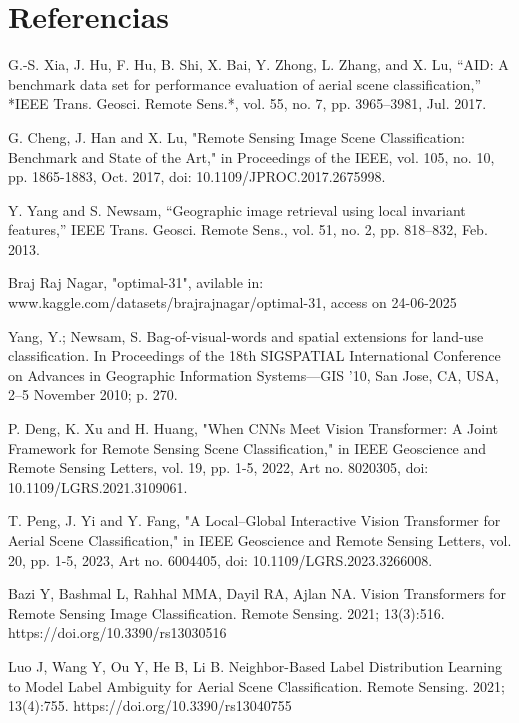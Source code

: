 \documentclass[conference]{IEEEtran}
\begin{document}
\section{Referencias}
\begin{thebibliography}{00}

     G.-S. Xia, J. Hu, F. Hu, B. Shi, X. Bai, Y. Zhong, L. Zhang, and X. Lu, ``AID: A benchmark data set for performance evaluation of aerial scene classification,'' *IEEE Trans. Geosci. Remote Sens.*, vol. 55, no. 7, pp. 3965--3981, Jul. 2017.

     G. Cheng, J. Han and X. Lu, "Remote Sensing Image Scene Classification: Benchmark and State of the Art," in Proceedings of the IEEE, vol. 105, no. 10, pp. 1865-1883, Oct. 2017, doi: 10.1109/JPROC.2017.2675998.

     Y. Yang and S. Newsam, “Geographic image retrieval using local invariant features,” IEEE Trans. Geosci. Remote Sens., vol. 51, no. 2, pp. 818–832, Feb. 2013.

     Braj Raj Nagar, "optimal-31", avilable in: www.kaggle.com/datasets/brajrajnagar/optimal-31, access on 24-06-2025

     Yang, Y.; Newsam, S. Bag-of-visual-words and spatial extensions for land-use classification. In Proceedings of the 18th SIGSPATIAL International Conference on Advances in Geographic Information Systems—GIS ’10, San Jose, CA, USA, 2–5 November 2010; p. 270.


    P. Deng, K. Xu and H. Huang, "When CNNs Meet Vision Transformer: A Joint Framework for Remote Sensing Scene Classification," in IEEE Geoscience and Remote Sensing Letters, vol. 19, pp. 1-5, 2022, Art no. 8020305, doi: 10.1109/LGRS.2021.3109061.

    T. Peng, J. Yi and Y. Fang, "A Local–Global Interactive Vision Transformer for Aerial Scene Classification," in IEEE Geoscience and Remote Sensing Letters, vol. 20, pp. 1-5, 2023, Art no. 6004405, doi: 10.1109/LGRS.2023.3266008.
    
    Bazi Y, Bashmal L, Rahhal MMA, Dayil RA, Ajlan NA. Vision Transformers for Remote Sensing Image Classification. Remote Sensing. 2021; 13(3):516. https://doi.org/10.3390/rs13030516 
    
    Luo J, Wang Y, Ou Y, He B, Li B. Neighbor-Based Label Distribution Learning to Model Label Ambiguity for Aerial Scene Classification. Remote Sensing. 2021; 13(4):755. https://doi.org/10.3390/rs13040755 


\end{thebibliography}
\end{document}

